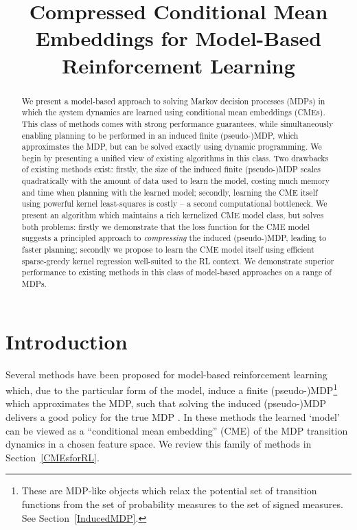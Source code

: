 \documentclass[letterpaper]{article}
\newcommand{\CsabaFLAM}{DBLP:conf/adprl/YaoSPZ14}
\newcommand{\GrunewalderEmbeddingsRL}{GrunewalderEmbeddingsMDP}
\newcommand{\OrmoneitKBRL}{DBLP:journals/ml/OrmoneitS02}
\begin{document}
%
\title{Compressed Conditional Mean Embeddings for Model-Based Reinforcement Learning}
\maketitle

\begin{abstract} We present a model-based approach to solving Markov decision processes (MDPs) in which the system dynamics are learned using conditional mean embeddings (CMEs). This class of methods comes with strong performance guarantees, while simultaneously enabling planning to be performed in an induced finite (pseudo-)MDP, which approximates the MDP, but can be solved exactly using dynamic programming.
%
We begin by presenting a unified view of existing algorithms in this class. Two drawbacks of existing methods exist: firstly, the size of the induced finite (pseudo-)MDP scales quadratically with the amount of data used to learn the model, costing much memory and time when planning with the learned model; secondly, learning the CME itself using powerful kernel least-squares is costly -- a second computational bottleneck. We present an algorithm which maintains a rich kernelized CME model class, but solves both problems: firstly we demonstrate that the loss function for the CME model suggests a principled approach to \emph{compressing} the induced (pseudo-)MDP, leading to faster planning; secondly we propose to learn the CME model itself using efficient sparse-greedy kernel regression well-suited to the RL context. We demonstrate superior performance to existing methods in this class of model-based approaches on a range of MDPs.
\end{abstract}

\section{Introduction}

Several methods have been proposed for model-based reinforcement learning which, due to the particular form of the model, induce a finite (pseudo-)MDP\footnote{These are MDP-like objects which relax the potential set of transition functions from the set of probability measures to the set of signed measures. See Section~\ref{InducedMDP}.} which approximates the MDP, such that solving the induced (pseudo-)MDP delivers a good policy for the true MDP \citep{\OrmoneitKBRL,\GrunewalderEmbeddingsRL,\CsabaFLAM}. In these methods the learned `model' can be viewed as a ``conditional mean embedding'' (CME) of the MDP transition dynamics in a chosen feature space. We review this family of methods in Section~\ref{CMEsforRL}.
\end{document}
